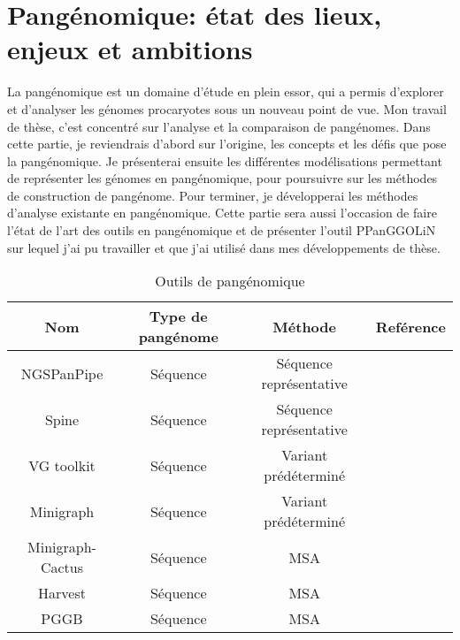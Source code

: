 \chapter{Pangénomique: état des lieux, enjeux et ambitions}

 La pangénomique est un domaine d'étude en plein essor, qui a permis d'explorer et d'analyser les génomes procaryotes sous un nouveau point de vue. Mon travail de thèse, c'est concentré sur l'analyse et la comparaison de pangénomes. Dans cette partie, je reviendrais d'abord sur l'origine, les concepts et les défis que pose la pangénomique.  Je présenterai ensuite les différentes modélisations permettant de représenter les génomes en pangénomique, pour poursuivre sur les méthodes de construction de pangénome. Pour terminer, je développerai les méthodes d'analyse existante en pangénomique. Cette partie sera aussi l'occasion de faire l'état de l'art des outils en pangénomique et de présenter l'outil PPanGGOLiN sur lequel j'ai pu travailler et que j'ai utilisé dans mes développements de thèse.




% 
% 
% 

\begin{table}[htbp]
    \centering
    \begin{tabular}{|c|c|c|c|}
        \hline
        Nom & Type de pangénome & Méthode & Reférence \\
        \hline
        NGSPanPipe & Séquence & Séquence représentative & \cite{kulsum_ngspanpipe_2018} \\
        \hline
        Spine & Séquence & Séquence représentative & \cite{ozer_characterization_2014}\\
        \hline
        VG toolkit & Séquence & Variant prédéterminé & \cite{garrison_variation_2018} \\
        \hline
        Minigraph & Séquence & Variant prédéterminé & \cite{li_design_2020} \\
        \hline
        Minigraph-Cactus & Séquence & MSA & \cite{hickey_pangenome_2024}\\
        \hline
        Harvest & Séquence & MSA & \cite{treangen_harvest_2014} \\
        \hline
        PGGB & Séquence & MSA & \cite{garrison_building_2024}\\
        \hline
        
        
    \end{tabular}
    \caption{Outils de pangénomique}
    \label{tab:pangenomicTools}
\end{table}